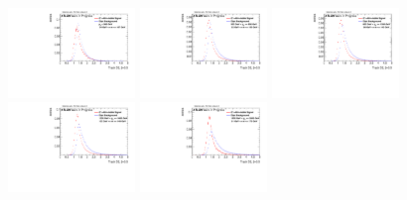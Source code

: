 \begin{figure}[H]
\bigskip
\includegraphics[width=0.3\textwidth]{sascha_input/Appendix/Distributions/higgs/distributions/beta05/h_normal_tj_D2_05_bin1.pdf} 	\hspace{1mm}
\includegraphics[width=0.3\textwidth]{sascha_input/Appendix/Distributions/higgs/distributions/beta05/h_normal_tj_D2_05_bin2.pdf} 	\hspace{4mm}
\includegraphics[width=0.3\textwidth]{sascha_input/Appendix/Distributions/higgs/distributions/beta05/h_normal_tj_D2_05_bin3.pdf} 
\bigskip
\includegraphics[width=0.3\textwidth]{sascha_input/Appendix/Distributions/higgs/distributions/beta05/h_normal_tj_D2_05_bin4.pdf} 	\hspace{4mm}
\includegraphics[width=0.3\textwidth]{sascha_input/Appendix/Distributions/higgs/distributions/beta05/h_normal_tj_D2_05_bin5.pdf} 


\end{figure}
